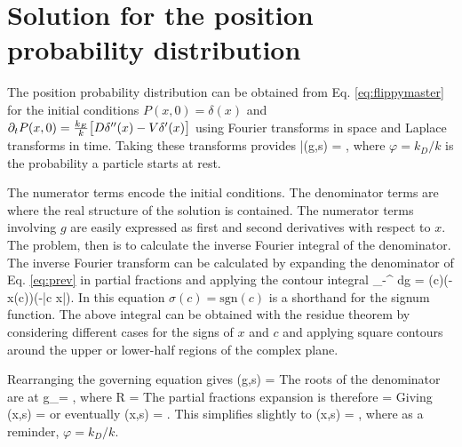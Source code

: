 \section{Solution for the position probability distribution}
\label{sec:fluccymastersol}
The position probability distribution can be obtained from Eq. \ref{eq:flippymaster} for the initial conditions $P(x,0) = \delta(x)$ and $ \partial_t P(x,0) = \frac{k_E}{k}\big[D\delta''(x)-V \delta'(x) \big]$ using Fourier transforms in space and Laplace transforms in time. Taking these transforms provides
\be \bar{}(g,s) = ,  \label{eq:prev}\ee
where $\varphi = k_D/k$ is the probability a particle starts at rest.

The numerator terms encode the initial conditions. The denominator terms are where the real structure of the solution is contained.
The numerator terms involving $g$ are easily expressed as first and second derivatives with respect to $x$. The problem, then is to calculate the inverse Fourier integral of the denominator.
The inverse Fourier transform can be calculated by expanding the denominator of Eq. \ref{eq:prev} in partial fractions and applying the contour integral \citep[e.g.][]{Arfken1985}
\be \int_{-\infty}^\infty {}  dg = \sigma(c)\theta(-x\sigma(c))\exp\big(-|c x|\big). \label{eq:contour}\ee
In this equation $\sigma(c) = \text{sgn}(c)$ is a shorthand for the signum function. The above integral can be obtained with the residue theorem by considering different cases for the signs of $x$ and $c$ and applying square contours around the upper or lower-half regions of the complex plane.

Rearranging the governing equation gives
\be {}(g,s) = \ee
The roots of the denominator are at
\be g_\pm = \Big[ 1  \pm R \Big],\ee
where
\be R = \ee
The partial fractions expansion is therefore
\be {} = \ee
Giving 
\be {}(x,s) = \ee
or eventually
\be {}(x,s) = .\ee
This simplifies slightly to
\be {}(x,s) = \exp{}, \label{eq:laplaceapp}\ee
where as a reminder, $\varphi = k_D/k$.

